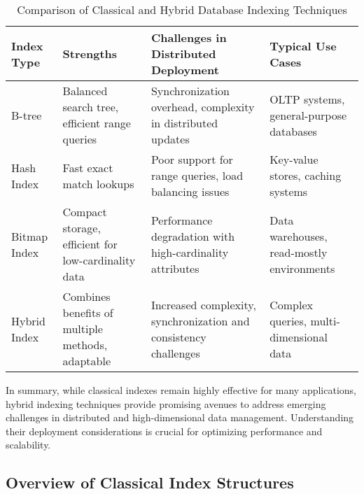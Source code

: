 \documentclass[sigconf]{acmart}
\begin{document}
\begin{table*}[htbp]
\centering
\caption{Comparison of Classical and Hybrid Database Indexing Techniques}
\label{tab:index-comparison}
\begin{adjustbox}{max width=\textwidth}
\begin{tabular}{@{}llll@{}}
\toprule
Index Type      & Strengths                      & Challenges in Distributed Deployment              & Typical Use Cases                 \\ \midrule
B-tree          & Balanced search tree, efficient range queries & Synchronization overhead, complexity in distributed updates & OLTP systems, general-purpose databases \\
Hash Index      & Fast exact match lookups       & Poor support for range queries, load balancing issues        & Key-value stores, caching systems            \\
Bitmap Index    & Compact storage, efficient for low-cardinality data & Performance degradation with high-cardinality attributes & Data warehouses, read-mostly environments   \\
Hybrid Index    & Combines benefits of multiple methods, adaptable & Increased complexity, synchronization and consistency challenges & Complex queries, multi-dimensional data     \\
\bottomrule
\end{tabular}
\end{adjustbox}
\end{table*}

In summary, while classical indexes remain highly effective for many applications, hybrid indexing techniques provide promising avenues to address emerging challenges in distributed and high-dimensional data management. Understanding their deployment considerations is crucial for optimizing performance and scalability.

\subsection{Overview of Classical Index Structures}
\end{document}
